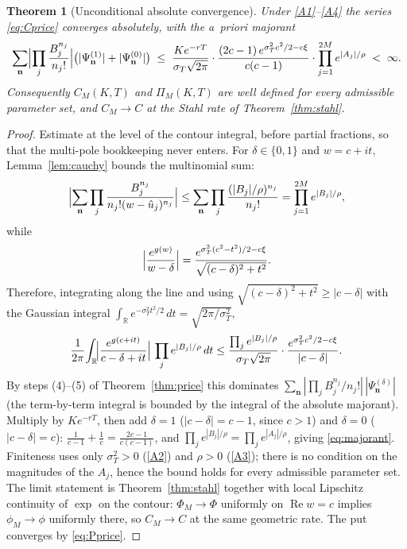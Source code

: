 \documentclass[11pt]{article}
\newtheorem{theorem}{Theorem}[section]
\newcommand{\R}{\mathbb{R}}
\DeclareMathOperator{\Real}{Re}
\begin{document}
\begin{theorem}[Unconditional absolute convergence]\label{thm:absconv}
Under \ref{A1}--\ref{A4} the series \eqref{eq:Cprice} converges absolutely,
with the a~priori majorant
\begin{equation}\label{eq:majorant}
\sum_{\mathbf n}\Bigl|\prod_j\frac{B_j^{n_j}}{n_j!}\Bigr|
\bigl(|\Psi^{(1)}_{\mathbf n}|+|\Psi^{(0)}_{\mathbf n}|\bigr)
\;\le\;
\frac{K e^{-rT}}{\sigma_T\sqrt{2\pi}}\cdot
\frac{(2c-1)\,e^{\sigma_T^2c^2/2-c\xi}}{c(c-1)}\cdot
\prod_{j=1}^{2M}e^{|A_j|/\rho}\;<\;\infty .
\end{equation}
Consequently $C_M(K,T)$ and $\Pi_M(K,T)$ are well defined for every
admissible parameter set, and $C_M\to C$ at the Stahl rate of
Theorem~\ref{thm:stahl}.
\end{theorem}

\begin{proof}
Estimate at the level of the contour integral, before partial fractions, so
that the multi-pole bookkeeping never enters. For $\delta\in\{0,1\}$ and
$w=c+it$, Lemma~\ref{lem:cauchy} bounds the multinomial sum:
\begin{equation}\label{eq:abs-pf1}
\Bigl|\sum_{\mathbf n}\prod_j\frac{B_j^{n_j}}{n_j!(w-\hat u_j)^{n_j}}\Bigr|
\le\sum_{\mathbf n}\prod_j\frac{(|B_j|/\rho)^{n_j}}{n_j!}
=\prod_{j=1}^{2M}e^{|B_j|/\rho},
\end{equation}
while
\begin{equation}\label{eq:abs-pf2}
\Bigl|\frac{e^{g(w)}}{w-\delta}\Bigr|
=\frac{e^{\sigma_T^2(c^2-t^2)/2-c\xi}}{\sqrt{(c-\delta)^2+t^2}} .
\end{equation}
Therefore, integrating along the line and using
$\sqrt{(c-\delta)^2+t^2}\ge|c-\delta|$ with the Gaussian integral
$\int_\R e^{-\sigma_T^2t^2/2}\,dt=\sqrt{2\pi/\sigma_T^2}$,
\begin{equation}\label{eq:abs-pf3}
\frac{1}{2\pi}\!\int_\R\!\Bigl|\frac{e^{g(c+it)}}{c-\delta+it}\Bigr|\,
\prod_j e^{|B_j|/\rho}\,dt
\le\frac{\prod_j e^{|B_j|/\rho}}{\sigma_T\sqrt{2\pi}}\cdot
\frac{e^{\sigma_T^2c^2/2-c\xi}}{|c-\delta|}.
\end{equation}
By steps (4)--(5) of Theorem~\ref{thm:price} this dominates
$\sum_{\mathbf n}|\prod_jB_j^{n_j}/n_j!|\,|\Psi^{(\delta)}_{\mathbf n}|$
(the term-by-term integral is bounded by the integral of the absolute
majorant). Multiply by $K e^{-rT}$, then add $\delta=1$ ($|c-\delta|=c-1$, since
$c>1$) and $\delta=0$ ($|c-\delta|=c$): $\tfrac{1}{c-1}+\tfrac1c
=\tfrac{2c-1}{c(c-1)}$, and $\prod_je^{|B_j|/\rho}=\prod_je^{|A_j|/\rho}$,
giving \eqref{eq:majorant}. Finiteness uses only $\sigma_T^2>0$ (\ref{A2})
and $\rho>0$ (\ref{A3}); there is no condition on the magnitudes of the
$A_j$, hence the bound holds for every admissible parameter set. The limit
statement is Theorem~\ref{thm:stahl} together with local Lipschitz
continuity of $\exp$ on the contour: $\Phi_M\to\Phi$ uniformly on
$\Real w=c$ implies $\phi_M\to\phi$ uniformly there, so $C_M\to C$ at the
same geometric rate. The put converges by \eqref{eq:Pprice}.
\end{proof}
\end{document}
